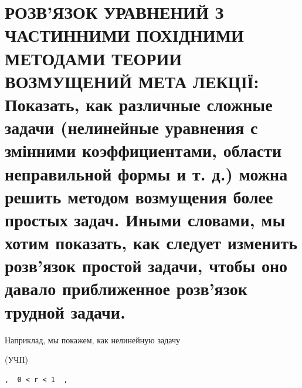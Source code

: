 \documentclass[
  ukrainian,
]{article}
\begin{document}
\section{РОЗВ'ЯЗОК УРАВНЕНИЙ З ЧАСТИННИМИ ПОХІДНИМИ МЕТОДАМИ ТЕОРИИ
ВОЗМУЩЕНИЙ МЕТА ЛЕКЦІЇ: Показать, как различные сложные задачи
(нелинейные уравнения с змінними коэффициентами, области неправильной
формы и т. д.) можна решить методом возмущения более простых задач.
Иными словами, мы хотим показать, как следует изменить розв'язок простой
задачи, чтобы оно давало приближенное розв'язок трудной
задачи.}\label{ux440ux43eux437ux432ux44fux437ux43eux43a-ux443ux440ux430ux432ux43dux435ux43dux438ux439-ux437-ux447ux430ux441ux442ux438ux43dux43dux438ux43cux438-ux43fux43eux445ux456ux434ux43dux438ux43cux438-ux43cux435ux442ux43eux434ux430ux43cux438-ux442ux435ux43eux440ux438ux438-ux432ux43eux437ux43cux443ux449ux435ux43dux438ux439-ux43cux435ux442ux430-ux43bux435ux43aux446ux456ux457-ux43fux43eux43aux430ux437ux430ux442ux44c-ux43aux430ux43a-ux440ux430ux437ux43bux438ux447ux43dux44bux435-ux441ux43bux43eux436ux43dux44bux435-ux437ux430ux434ux430ux447ux438-ux43dux435ux43bux438ux43dux435ux439ux43dux44bux435-ux443ux440ux430ux432ux43dux435ux43dux438ux44f-ux441-ux437ux43cux456ux43dux43dux438ux43cux438-ux43aux43eux44dux444ux444ux438ux446ux438ux435ux43dux442ux430ux43cux438-ux43eux431ux43bux430ux441ux442ux438-ux43dux435ux43fux440ux430ux432ux438ux43bux44cux43dux43eux439-ux444ux43eux440ux43cux44b-ux438-ux442.-ux434.-ux43cux43eux436ux43dux430-ux440ux435ux448ux438ux442ux44c-ux43cux435ux442ux43eux434ux43eux43c-ux432ux43eux437ux43cux443ux449ux435ux43dux438ux44f-ux431ux43eux43bux435ux435-ux43fux440ux43eux441ux442ux44bux445-ux437ux430ux434ux430ux447.-ux438ux43dux44bux43cux438-ux441ux43bux43eux432ux430ux43cux438-ux43cux44b-ux445ux43eux442ux438ux43c-ux43fux43eux43aux430ux437ux430ux442ux44c-ux43aux430ux43a-ux441ux43bux435ux434ux443ux435ux442-ux438ux437ux43cux435ux43dux438ux442ux44c-ux440ux43eux437ux432ux44fux437ux43eux43a-ux43fux440ux43eux441ux442ux43eux439-ux437ux430ux434ux430ux447ux438-ux447ux442ux43eux431ux44b-ux43eux43dux43e-ux434ux430ux432ux430ux43bux43e-ux43fux440ux438ux431ux43bux438ux436ux435ux43dux43dux43eux435-ux440ux43eux437ux432ux44fux437ux43eux43a-ux442ux440ux443ux434ux43dux43eux439-ux437ux430ux434ux430ux447ux438.}

Наприклад, мы покажем, как нелинейную задачу

(УЧП)

\begin{verbatim}
,  0 < r < 1  ,
\end{verbatim}
\end{document}
